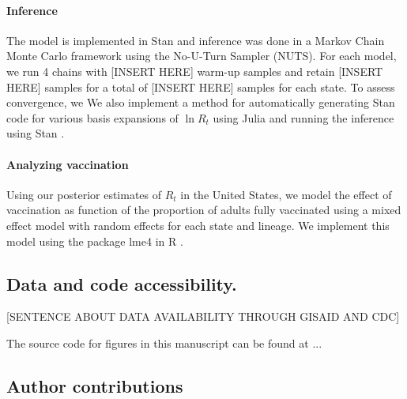 \documentclass[12pt]{article}
\begin{document}
\paragraph{Inference}

The model is implemented in Stan and inference was done in a Markov Chain Monte Carlo framework using the No-U-Turn Sampler (NUTS). \cites{carpenter2017stan, hoffman2011nouturn}
For each model, we run 4 chains with [INSERT HERE] warm-up samples and retain [INSERT HERE] samples for a total of [INSERT HERE] samples for each state.
To assess convergence, we
We also implement a method for automatically generating Stan code for various basis expansions of $\ln R_{t}$ using Julia and running the inference using Stan \cites{bezanson2017julia, carpenter2017stan}.

\paragraph{Analyzing vaccination}

Using our posterior estimates of $R_{t}$ in the United States, we model the effect of vaccination as function of the proportion of adults fully vaccinated using a mixed effect model with random effects for each state and lineage. We implement this model using the package lme4 in R \cites{Bates2015, RLang2017}.


\subsection*{Data and code accessibility.}

[SENTENCE ABOUT DATA AVAILABILITY THROUGH GISAID AND CDC]

The source code for figures in this manuscript can be found at ...

\subsection*{Author contributions}
\end{document}
